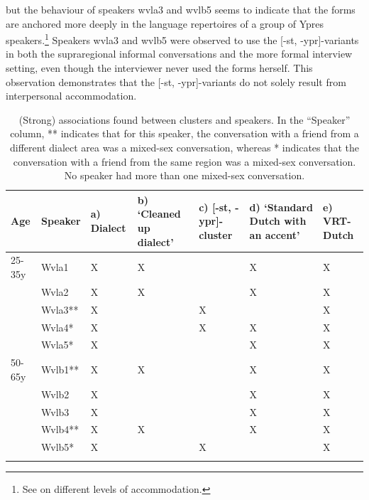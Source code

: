 \documentclass[output=paper]{LSP/langsci}
\begin{document}
but the behaviour of speakers wvla3 and wvlb5 seems to indicate that the forms are anchored more deeply in the language repertoires of a group of Ypres speakers.\footnote{See \citet{auer_convergence_1996} on different levels of accommodation.} Speakers wvla3 and wvlb5 were observed to use the [-st, -ypr]-variants in both the supraregional informal conversations and the more formal interview setting, even though the interviewer never used the forms herself. This observation demonstrates that the [-st, -ypr]-variants do not solely result from interpersonal accommodation. 

\begin{table}
\begin{tabularx}{\textwidth}{XXXXXXX}
\lsptoprule
{Age} & Speaker & a) Dialect & b) `Cleaned up dialect' & c) [-st, -ypr]-cluster & d) `Standard Dutch with an accent' & e) VRT-Dutch\\
\midrule
{25-35y} & Wvla1 & X & X &  & X & X\\
& Wvla2 & X & X &  & X & X\\
\hhline{~------} & Wvla3** & X &  & X &  & X\\
\hhline{~------} & Wvla4* & X &  & X & X & X\\
\hhline{~------} & Wvla5* & X &  &  & X & X\\
{50-65y} & Wvlb1** & X & X &  & X & X\\
& Wvlb2 & X &  &  & X & X\\
\hhline{~------} & Wvlb3 & X &  &  & X & X\\
\hhline{~------} & Wvlb4** & X & X &  & X & X\\
\hhline{~------} & Wvlb5* & X &  & X &  & X\\
\hhline{~------}
\lspbottomrule
\end{tabularx}
\caption{(Strong) associations found between clusters and speakers. In the ``Speaker'' column, ** indicates that for this speaker, the conversation with a friend from a different dialect area was a mixed-sex conversation, whereas * indicates that the conversation with a friend from the same region was a mixed-sex conversation. No speaker had more than one mixed-sex conversation.}
\label{tab:2}
\end{table}
\end{document}
